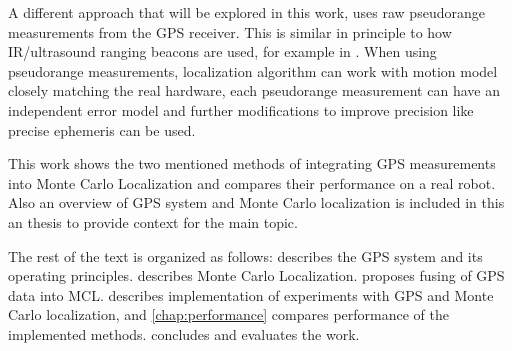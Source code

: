 A different approach that will be explored in this work, uses raw
pseudorange measurements from the GPS receiver.
This is similar in principle to how IR/ultrasound ranging beacons are used, for
example in \cite{some-beacon-ref}.
When using pseudorange measurements, localization algorithm can work with motion model closely
matching the real hardware, each pseudorange measurement can have an
independent error model and further modifications to improve precision like precise
ephemeris can be used.


\vspace{1.5em}


This work shows the two mentioned  methods of integrating GPS measurements
into Monte Carlo Localization and compares their performance on a real robot.
Also an overview of GPS system and Monte Carlo localization is included in
this an thesis to provide context for the main topic.


The rest of the text is organized as follows:
 describes the GPS system and its operating principles.
 describes Monte Carlo Localization.
 proposes fusing of GPS data into MCL.
 describes implementation of experiments with GPS and
Monte Carlo localization,
and \cref{chap:performance} compares performance of the implemented methods.
 concludes and evaluates the work.
